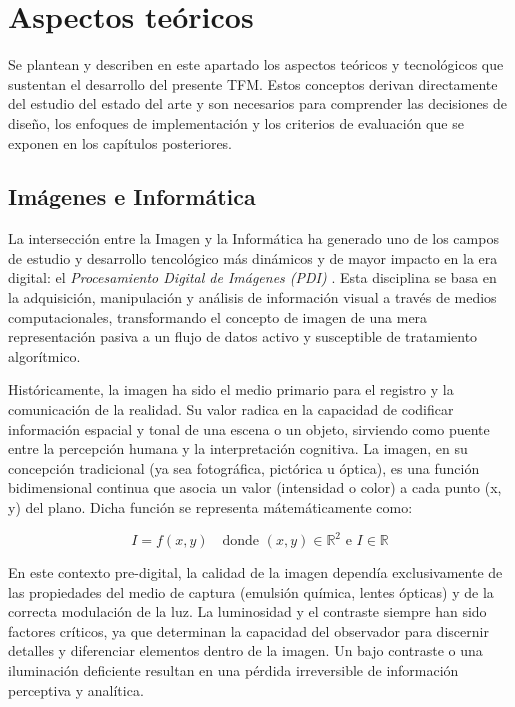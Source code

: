 \section{Aspectos teóricos} \label{sec:3_aspectos_teoricos}
Se plantean y describen en este apartado los aspectos teóricos y tecnológicos que sustentan 
el desarrollo del presente TFM. Estos conceptos derivan directamente del estudio del estado del 
arte y son necesarios para comprender las decisiones de diseño, los enfoques de implementación
y los criterios de evaluación que se exponen en los capítulos posteriores.

\subsection{Imágenes e Informática} \label{subsec:3_1_imagenes_informatica}
La intersección entre la Imagen y la Informática ha generado uno de los campos de estudio 
y desarrollo tencológico más dinámicos y de mayor impacto en la era digital: el 
\textit{Procesamiento Digital de Imágenes (PDI)} \cite{pdi}. Esta disciplina se basa en la adquisición,
manipulación y análisis de información visual a través de medios computacionales, transformando
el concepto de imagen de una mera representación pasiva a un flujo de datos activo y 
susceptible de tratamiento algorítmico.

Históricamente, la imagen ha sido el medio primario para el registro y la comunicación de la 
realidad. Su valor radica en la capacidad de codificar información espacial y tonal de una 
escena o un objeto, sirviendo como puente entre la percepción humana y la interpretación 
cognitiva. La imagen, en su concepción tradicional (ya sea fotográfica, pictórica u óptica),
es una función bidimensional continua que asocia un valor (intensidad o color) 
a cada punto (x, y) del plano. Dicha función se representa mátemáticamente como:

\begin{myequation}
    \begin{equation}
        I = f(x,y) \quad \text{donde } (x,y) \in \mathbb{R}^2 \text{ e } I \in \mathbb{R}
        \label{eq:3_1_imagen_funcion}
    \end{equation}
    \caption{Representación básica de una imagen en términos matemáticos}
\end{myequation}

En este contexto pre-digital, la calidad de la imagen dependía exclusivamente de las 
propiedades del medio de captura (emulsión química, lentes ópticas) y de la correcta 
modulación de la luz. La luminosidad y el contraste siempre han sido factores críticos, 
ya que determinan la capacidad del observador para discernir detalles y diferenciar
elementos dentro de la imagen. Un bajo contraste o una iluminación deficiente resultan en 
una pérdida irreversible de información perceptiva y analítica.

